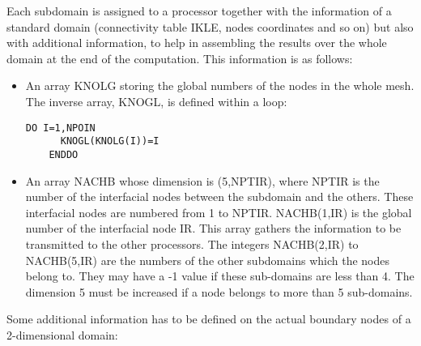 Each subdomain is assigned to a processor together with the information of a
standard domain (connectivity table IKLE, nodes coordinates and so on) but also
with additional information, to help in assembling the results over the whole
domain at the end of the computation. This information is as follows:
\begin{itemize}
  \item An array KNOLG storing the global numbers of the nodes in
    the whole mesh. The inverse array, KNOGL, is defined within a loop:
    \begin{lstlisting}[language=TelFortran]
    DO I=1,NPOIN
      KNOGL(KNOLG(I))=I
    ENDDO
    \end{lstlisting}
  \item An array NACHB whose dimension is (5,NPTIR), where NPTIR
    is the number of the interfacial nodes between the subdomain and the
    others.  These interfacial nodes are numbered from 1 to NPTIR. NACHB(1,IR)
    is the global number of the interfacial node IR. This array gathers the
    information to be transmitted to the other processors. The integers
    NACHB(2,IR) to NACHB(5,IR) are the numbers of the other subdomains which
    the nodes belong to. They may have a -1 value if these sub-domains are less
    than 4. The dimension 5 must be increased if a node belongs to more than 5
    sub-domains.
\end{itemize}
Some additional information has to be defined on the actual boundary nodes of a
2-dimensional domain:
